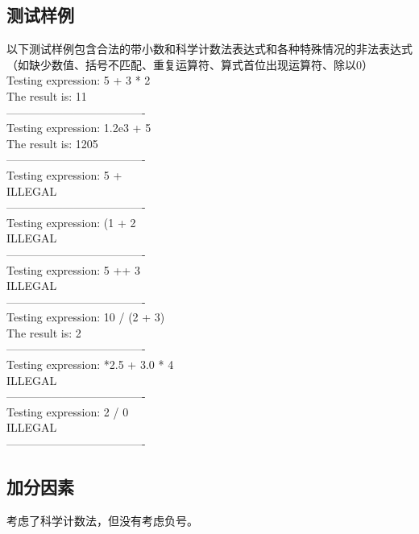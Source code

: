 \documentclass[UTF8]{ctexart}
\begin{document}
\subsection{测试样例}
以下测试样例包含合法的带小数和科学计数法表达式和各种特殊情况的非法表达式（如缺少数值、括号不匹配、重复运算符、算式首位出现运算符、除以0）\\
Testing expression: 5 + 3 * 2\\
The result is: 11\\
-------------------------------------\\
Testing expression: 1.2e3 + 5\\
The result is: 1205\\
-------------------------------------\\
Testing expression: 5 + \\
ILLEGAL\\
-------------------------------------\\
Testing expression: (1 + 2\\
ILLEGAL\\
-------------------------------------\\
Testing expression: 5 ++ 3\\
ILLEGAL\\
-------------------------------------\\
Testing expression: 10 / (2 + 3)\\
The result is: 2\\
-------------------------------------\\
Testing expression: *2.5 + 3.0 * 4\\
ILLEGAL\\
-------------------------------------\\
Testing expression: 2 / 0\\
ILLEGAL\\
-------------------------------------\\

\subsection{加分因素}
考虑了科学计数法，但没有考虑负号。
\end{document}
